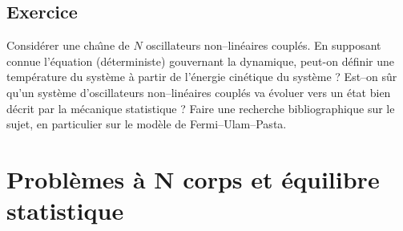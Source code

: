 \documentclass[12pt]{book}
\begin{document}
\section{Exercice}

\begin{exo}
Consid\'erer une cha\^\i ne de $N$ oscillateurs non--lin\'eaires coupl\'es. En
supposant connue l'\'equation (d\'eterministe) gouvernant la dynamique,
peut-on d\'efinir une temp\'erature du syst\`eme \`a partir de l'\'energie
cin\'etique du syst\`eme ? Est--on s\^ur qu'un syst\`eme d'oscillateurs
non--lin\'eaires coupl\'es va \'evoluer vers un \'etat bien d\'ecrit par la
m\'ecanique statistique ? Faire une recherche bibliographique sur le sujet, en
particulier sur le mod\`ele de Fermi--Ulam--Pasta.
\end{exo}



\chapter{Probl\`emes \`a N corps et \'equilibre
statistique}\label{chapNcorpsstat} 
\end{document}
